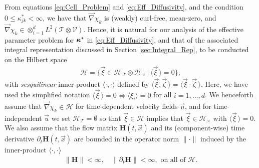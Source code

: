 \documentclass[11pt]{amsart}
\newcommand{\Hb}{\mathbf{H}}
\newcommand{\Tc}{\mathcal{T}}
\newcommand{\Vc}{\mathcal{V}}
\newcommand{\Hs}{\mathscr{H}}
\newcommand\bkappa{\mbox{\boldmath${\kappa}$}}
\begin{document}
From equations \eqref{eq:Cell_Problem} and \eqref{eq:Eff_Diffusivity},
and the condition $0\leq\kappa^*_{jk}<\infty$, we have that $\vec{\nabla}\chi_k$ is (weakly)
curl-free, mean-zero, and
$\vec{\nabla}\chi_k\in\otimes_{i=1}^dL^2(\Tc\otimes\Vc)$. Hence,
it is natural for our analysis of the effective parameter problem for
$\bkappa^*$ in \eqref{eq:Eff_Diffusivity}, and that of the associated
integral representation discussed in Section \ref{sec:Integral_Rep},
to be conducted on the Hilbert space
%
\begin{align}\label{eq:Hilbert_Space}
  \Hs=\{\vec{\xi}\in\Hs_{\,\Tc}\otimes\Hs_\times\,|\, \langle\vec{\xi}\,\rangle=0\},
\end{align}
%
with \emph{sesquilinear} inner-product $\langle\cdot,\cdot\rangle$ defined by
$\langle\vec{\xi},\vec{\zeta}\,\rangle=\langle\vec{\xi}\cdot\vec{\zeta}\,\rangle$. 
Here, we have used the simplified notation $\langle\vec{\xi}\,\rangle=0\iff\langle\xi_i\rangle=0$ for
all $i=1,\ldots,d$. We henceforth assume that $\vec{\nabla}\chi_k\in\mathscr{H}$ for
time-dependent velocity fields $\vec{u}$, and for time-independent
$\vec{u}$ we set $\mathscr{H}_{\Tc}=\emptyset$ so that $\vec{\xi}\in\mathscr{H}$
implies that $\vec{\xi}\in\mathscr{H}_\times$ with $\langle\vec{\xi}\,\rangle=0$. We also
assume that the flow matrix $\Hb(t,\vec{x})$ and its (component-wise)
time derivative $\partial_t\Hb(t,\vec{x})$ are bounded in the operator norm
$\|\cdot\|$ induced by the inner-product $\langle\cdot,\cdot\rangle$
\cite{Reed-1980,Stone:64,Stakgold:BVP:2000}   
%
\begin{align}\label{eq:Bounded_H}
  \|\Hb\|<\infty, \quad \|\partial_t\Hb\|<\infty, \text{ on all of } \Hs.
\end{align}
%
\end{document}
